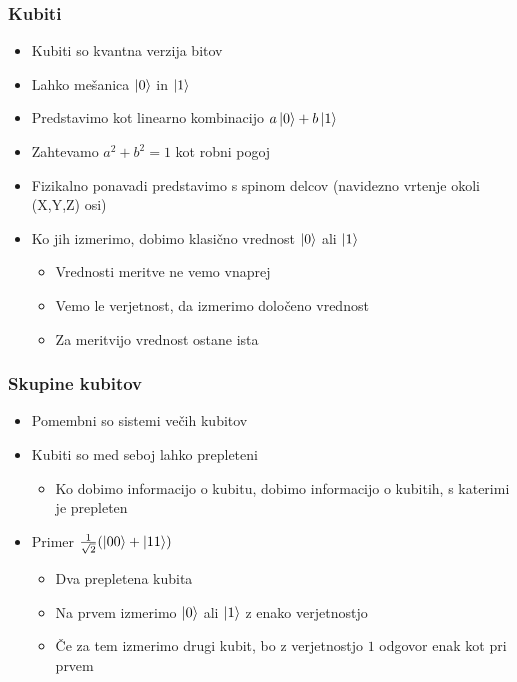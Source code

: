 \documentclass[10pt]{beamer}
\begin{document}
\begin{frame}
  \frametitle{Kubiti}
  \begin{itemize}
  \item Kubiti so kvantna verzija bitov
  \item Lahko mešanica \(\ket0\) in \(\ket1\)
  \item Predstavimo kot linearno kombinacijo \(a\ket0 + b\ket1\)
  \item Zahtevamo \(a^2+b^2 = 1\) kot robni pogoj
  \item Fizikalno ponavadi predstavimo s spinom delcov (navidezno vrtenje okoli (X,Y,Z) osi)
  \item Ko jih izmerimo, dobimo klasično vrednost \(\ket0\) ali \(\ket1\)\pause
    \begin{itemize}
    \item Vrednosti meritve ne vemo vnaprej
    \item Vemo le verjetnost, da izmerimo določeno vrednost
    \item Za meritvijo vrednost ostane ista
    \end{itemize}
  \end{itemize}
\end{frame}
\begin{frame}
  \frametitle{Skupine kubitov}
  \begin{itemize}
  \item Pomembni so sistemi večih kubitov
  \item Kubiti so med seboj lahko prepleteni
    \begin{itemize}
    \item Ko dobimo informacijo o kubitu, dobimo informacijo o kubitih, s katerimi je prepleten
    \end{itemize}\pause
  \item Primer \(\frac1{\sqrt2}(\ket{00}+\ket{11})\)
    \begin{itemize}
    \item Dva prepletena kubita\pause
    \item Na prvem izmerimo \(\ket0\) ali \(\ket1\) z enako verjetnostjo
    \item Če za tem izmerimo drugi kubit, bo z verjetnostjo \(1\) odgovor enak kot pri prvem
    \end{itemize}
  \end{itemize}
\end{frame}
\end{document}
